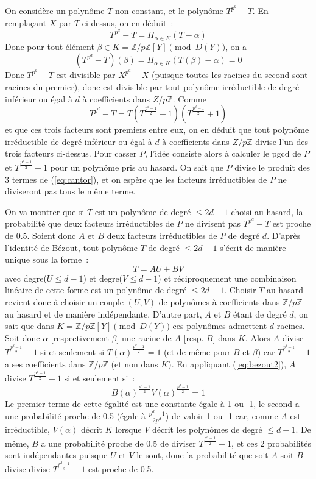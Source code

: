 \documentclass[a4paper,11pt]{article}
\newcommand{\Z}{{\mathbb{Z}}}
\begin{document}
On considère un polynôme $T$ non constant, et le polynôme
$T^{p^d}-T$. En remplaçant $X$ par $T$ ci-dessus, on en déduit~:
\[T^{p^d}-T=\Pi_{\alpha \in K }(T-\alpha) \]
Donc pour tout élément $\beta \in K=\Z/p\Z[Y] \pmod {D(Y)}$, on a
\[(T^{p^d}-T)(\beta)=\Pi_{\alpha \in K }(T(\beta)-\alpha)=0\]
Donc $T^{p^d}-T$ est divisible par $X^{p^d}-X$ (puisque toutes les racines
du second sont racines du premier), donc est divisible par tout polynôme
irréductible de degré inférieur ou égal à $d$ à coefficients dans $Z/p\Z$.
Comme
\begin{equation} \label{eq:cantor}
T^{p^d}-T=T(T^{\frac{p^d-1}{2}}-1)(T^{\frac{p^d-1}{2}}+1)
\end{equation}
et que ces trois facteurs sont premiers entre eux, on en déduit que tout 
polynôme irréductible de degré inférieur ou égal à $d$ à coefficients dans 
$Z/p\Z$ divise l'un des trois facteurs ci-dessus. Pour casser $P$, l'idée
consiste alors à calculer le pgcd de $P$ et $T^{\frac{p^d-1}{2}}-1$
pour un polynôme pris au hasard. On sait que $P$ divise le produit des
3 termes de (\ref{eq:cantor}), et on espère que les facteurs irréductibles
de $P$ ne diviseront pas tous le même terme.

On va montrer que si $T$ est un polynôme de degré $\leq 2d-1$ choisi au hasard,
la probabilité que deux facteurs irréductibles de $P$ ne divisent pas 
$T^{p^d}-T$ est proche de 0.5. Soient donc $A$ et $B$ deux facteurs
irréductibles de $P$ de degré $d$. D'après l'identité de Bézout, tout 
polynôme $T$ de degré $\leq 2d-1$ s'écrit de manière unique sous la forme~:
\begin{equation} \label{eq:bezout2} 
T = A U + B V 
\end{equation}
avec degre($U \leq d-1$) et degre($V \leq d-1$) et réciproquement 
une combinaison linéaire de cette forme est un polynôme de degré $\leq 2d-1$.
Choisir $T$ au hasard revient donc à choisir un couple $(U,V)$ de polynômes
à coefficients dans $\Z/p\Z$ au hasard et
de manière indépendante. D'autre part, $A$ et $B$ étant de degré $d$, on
sait que dans $K=\Z/p\Z[Y] \pmod{D(Y)}$ ces polynômes admettent $d$ racines.
Soit donc $\alpha$ [respectivement $\beta$] une racine de $A$ [resp. $B$]
dans $K$. Alors $A$ divise $T^{\frac{p^d-1}{2}}-1$
si et seulement si $T(\alpha )^{\frac{p^d-1}{2}}=1$ (et de même pour
$B$ et $\beta$) car $T^{\frac{p^d-1}{2}}-1$ a ses coefficients dans
$\Z/p\Z$ (et non dans $K$). 
En appliquant (\ref{eq:bezout2}), $A$ divise $T^{\frac{p^d-1}{2}}-1$
si et seulement si~:
\[ B(\alpha )^{\frac{p^d-1}{2}}V(\alpha )^{\frac{p^d-1}{2}}=1 \]
Le premier terme de cette égalité est une constante égale à 1 ou -1, 
le second a une probabilité proche de 0.5 (égale à $\frac{p^d-1}{2p^d}$)
de valoir 1 ou -1 car, comme $A$ est irréductible,
$V(\alpha)$ décrit $K$ lorsque $V$ décrit les 
polynômes de degré $\leq d-1$.
De même, $B$ a une probabilité proche de 0.5 de diviser 
$T^{\frac{p^d-1}{2}}-1$, et ces 2 probabilités sont indépendantes
puisque $U$ et $V$ le sont, donc la probabilité que soit $A$ soit $B$ divise
divise $T^{\frac{p^d-1}{2}}-1$ est proche de 0.5.
\end{document}

